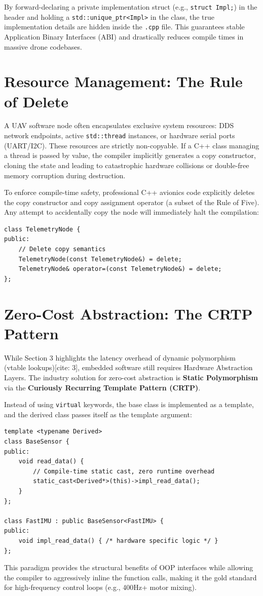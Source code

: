 \documentclass{article}
\begin{document}
By forward-declaring a private implementation struct (e.g., \texttt{struct Impl;}) in the header and holding a \texttt{std::unique\_ptr<Impl>} in the class, the true implementation details are hidden inside the \texttt{.cpp} file. This guarantees stable Application Binary Interfaces (ABI) and drastically reduces compile times in massive drone codebases.

\section{Resource Management: The Rule of Delete}
A UAV software node often encapsulates exclusive system resources: DDS network endpoints, active \texttt{std::thread} instances, or hardware serial ports (UART/I2C). These resources are strictly non-copyable. If a C++ class managing a thread is passed by value, the compiler implicitly generates a copy constructor, cloning the state and leading to catastrophic hardware collisions or double-free memory corruption during destruction.

To enforce compile-time safety, professional C++ avionics code explicitly deletes the copy constructor and copy assignment operator (a subset of the Rule of Five). Any attempt to accidentally copy the node will immediately halt the compilation:
\begin{verbatim}
class TelemetryNode {
public:
    // Delete copy semantics
    TelemetryNode(const TelemetryNode&) = delete;
    TelemetryNode& operator=(const TelemetryNode&) = delete;
};
\end{verbatim}

\section{Zero-Cost Abstraction: The CRTP Pattern}
While Section 3 highlights the latency overhead of dynamic polymorphism (vtable lookups)[cite: 3], 
embedded software still requires Hardware Abstraction Layers. The industry solution for zero-cost abstraction 
is \textbf{Static Polymorphism} via the \textbf{Curiously Recurring Template Pattern (CRTP)}.

Instead of using \texttt{virtual} keywords, the base class is implemented as a template, and the derived class passes itself as 
the template argument:

\begin{verbatim}
template <typename Derived>
class BaseSensor {
public:
    void read_data() {
        // Compile-time static cast, zero runtime overhead
        static_cast<Derived*>(this)->impl_read_data(); 
    }
};

class FastIMU : public BaseSensor<FastIMU> {
public:
    void impl_read_data() { /* hardware specific logic */ }
};
\end{verbatim}

This paradigm provides the structural benefits of OOP interfaces while allowing the compiler to aggressively inline the function calls, 
making it the gold standard for high-frequency control loops (e.g., 400Hz+ motor mixing).
\end{document}
